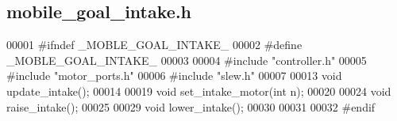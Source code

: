 \subsection{mobile\+\_\+goal\+\_\+intake.\+h}
\label{mobile__goal__intake_8h_source}

\begin{DoxyCode}
00001 \textcolor{preprocessor}{#ifndef \_MOBLE\_GOAL\_INTAKE\_}
00002 \textcolor{preprocessor}{#define \_MOBLE\_GOAL\_INTAKE\_}
00003 
00004 \textcolor{preprocessor}{#include "controller.h"}
00005 \textcolor{preprocessor}{#include "motor_ports.h"}
00006 \textcolor{preprocessor}{#include "slew.h"}
00007 
00013 \textcolor{keywordtype}{void} update_intake();
00014 
00019 \textcolor{keywordtype}{void} set_intake_motor(\textcolor{keywordtype}{int} n);
00020 
00024 \textcolor{keywordtype}{void} raise_intake();
00025 
00029 \textcolor{keywordtype}{void} lower_intake();
00030 
00031 
00032 \textcolor{preprocessor}{#endif}
\end{DoxyCode}
